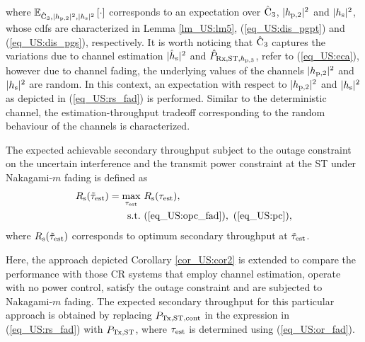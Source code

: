 where ${\mathbb E}_{\hat{\text{{C}}}_{\text{3}}, |h_{\text{p,2}}|^2, |h_{\text{s}}|^2}\left[ \cdot \right]$ corresponds to an expectation over $\hat{\text{{C}}}_{\text{3}}$, $|h_{\text{p,2}}|^2$ and $|h_{\text{s}}|^2$, whose cdfs are characterized in Lemma \ref{lm_US:lm5}, (\ref{eq_US:dis_pgpt}) and (\ref{eq_US:dis_pgs}), respectively. It is worth noticing that $\hat{\text{{C}}}_{\text{3}}$ captures the variations due to channel estimation $|\hat{h}_{\text{s}}|^2$ and $\hat{P}_{\text{Rx,ST,$h_{\text{p,3}}$}}$, refer to (\ref{eq_US:eca}), however due to channel fading, the underlying values of the channels $|h_{\text{p,2}}|^2$ and $|h_{\text{s}}|^2$ are random. In this context, an expectation with respect to $|h_{\text{p,2}}|^2$ and $|h_{\text{s}}|^2$ as depicted in (\ref{eq_US:rs_fad}) is performed.
Similar to the deterministic channel, the estimation-throughput tradeoff corresponding to the random behaviour of the channels is characterized. 
\begin{theorem} \label{th_US:th2}
\normalfont
The expected achievable secondary throughput subject to the outage constraint on the uncertain interference and the transmit power constraint at the ST under Nakagami-$m$ fading is defined as
\begin{align}
R_{\text{s}}(\tilde{\tau}_{\text{est}}) = \operatorname*{max}_{\tau_{\text{est}}}  & \text{      } {R_{\text{s}}(\tau_{\text{est}})}, 
 \label{eq_US:sys_fad} \\
\text{s.t.} & \text{ } (\ref{eq_US:opc_fad}), \text{  } (\ref{eq_US:pc}), \nonumber 
 \end{align}
where $R_{\text{s}}(\tilde{\tau}_{\text{est}})$ corresponds to optimum secondary throughput at $\tilde{\tau}_{\text{est}}$.  
\end{theorem}

\begin{coro} \label{cor_US:cor3}
\normalfont
Here, the approach depicted Corollary \ref{cor_US:cor2} is extended to compare the performance with those CR systems that employ channel estimation, operate with no power control, satisfy the outage constraint and are subjected to Nakagami-$m$ fading. The expected secondary throughput for this particular approach is obtained by replacing $P_{\text{Tx,ST,cont}}$ in the expression in (\ref{eq_US:rs_fad}) with $P_{\text{Tx,ST}}$, where $\tau_{\text{est}}$ is determined using (\ref{eq_US:or_fad}). 

\end{coro}
 
